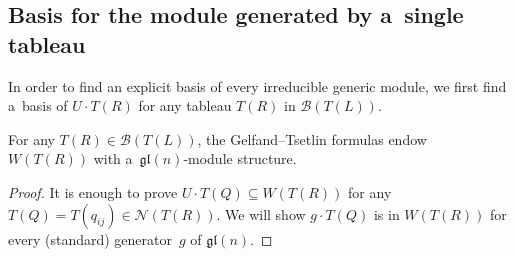 \subsection{Basis for the module generated by a~single tableau}
In order to f\/ind an explicit basis of every irreducible generic module, we f\/irst f\/ind a~basis of $U\cdot T(R)$ for any
tableau $T(R)$ in $\mathcal{B}(T(L))$.
\begin{Proposition}
\label{submodules of V(T(L))}
For any $T(R)\in\mathcal{B}(T(L))$, the Gelfand--Tsetlin formulas endow $ W(T(R))$ with a~$\mathfrak{gl}(n)$-module
structure.
\end{Proposition}
\begin{proof}
It is enough to prove $U\cdot T(Q)\subseteq W(T(R))$ for any $T(Q)=T(q_{ij})\in\mathcal{N}(T(R))$.
We will show $g\cdot T(Q)$ is in $W(T(R))$ for every (standard) generator~$g$ of $\mathfrak{gl}(n)$.


\end{proof}
